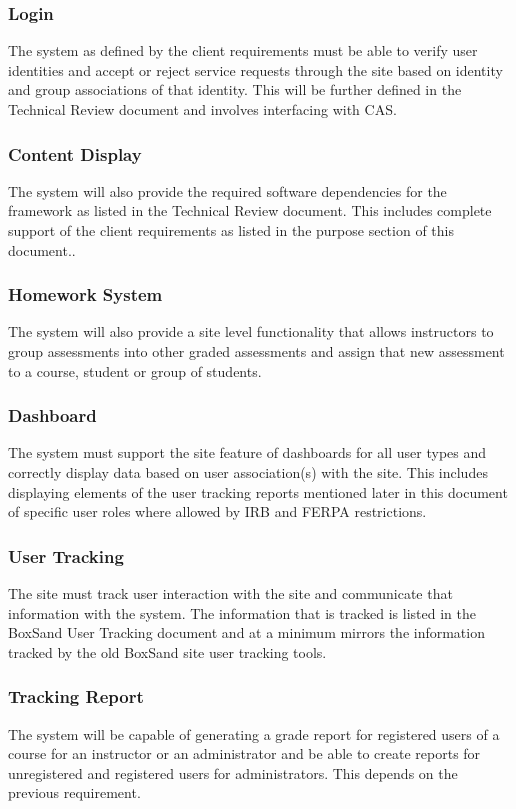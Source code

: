 \documentclass[onecolumn, draftclsnofoot,10pt, compsoc]{IEEEtran}
\begin{document}
\subsubsection{Login}
The system as defined by the client requirements must be able to verify user identities and accept or reject service requests through the site based on identity and group associations of that identity. This will be further defined in the Technical Review document and involves interfacing with CAS. 

\subsubsection{Content Display}
The system will also provide the required software dependencies for the framework as listed in the Technical Review document. This includes complete support of the client requirements as listed in the purpose section of this document..

\subsubsection{Homework System}
The system will also provide a site level functionality that allows instructors to group assessments into other graded assessments and assign that new assessment to a course, student or group of students. 

\subsubsection{Dashboard}
The system must support the site feature of dashboards for all user types and correctly display data based on user association(s) with the site. This includes displaying elements of the user tracking reports mentioned later in this document of specific user roles where allowed by IRB and FERPA restrictions. 

\subsubsection{User Tracking}
The site must track user interaction with the site and communicate that information with the system. The information that is tracked is listed in the BoxSand User Tracking document and at a minimum mirrors the information tracked by the old BoxSand site user tracking tools. 

\subsubsection{Tracking Report}
The system will be capable of generating a grade report for registered users of a course for an instructor or an administrator and be able to create reports for unregistered and registered users for administrators. This depends on the previous requirement.
\end{document}
